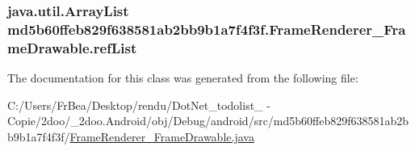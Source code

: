 \hypertarget{classmd5b60ffeb829f638581ab2bb9b1a7f4f3f_1_1_frame_renderer___frame_drawable_9768e82d526f8d55fc2d2d5cc7f6bf10}{
\subsubsection[{refList}]{\setlength{\rightskip}{0pt plus 5cm}java.util.ArrayList {\bf md5b60ffeb829f638581ab2bb9b1a7f4f3f.FrameRenderer\_\-FrameDrawable.refList}}}
\label{classmd5b60ffeb829f638581ab2bb9b1a7f4f3f_1_1_frame_renderer___frame_drawable_9768e82d526f8d55fc2d2d5cc7f6bf10}




The documentation for this class was generated from the following file:\begin{CompactItemize}
\item 
C:/Users/FrBea/Desktop/rendu/DotNet\_\-todolist\_ - Copie/2doo/\_\-2doo.Android/obj/Debug/android/src/md5b60ffeb829f638581ab2bb9b1a7f4f3f/\hyperlink{_frame_renderer___frame_drawable_8java}{FrameRenderer\_\-FrameDrawable.java}\end{CompactItemize}
